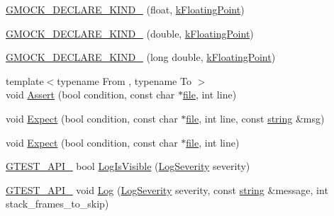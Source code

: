 \begin{DoxyCompactItemize}
\item 
\hyperlink{namespacetesting_1_1internal_ad4ebf1b53b79ac38fbd18ccf4d63ceca}{G\+M\+O\+C\+K\+\_\+\+D\+E\+C\+L\+A\+R\+E\+\_\+\+K\+I\+N\+D\+\_\+} (float, \hyperlink{namespacetesting_1_1internal_aa8747bda20137c9aa7f846dee830e686acdce59b8c136926ace18aa9c2995878d}{k\+Floating\+Point})
\item 
\hyperlink{namespacetesting_1_1internal_a45748f4c08b868cb4939081769cdc7b1}{G\+M\+O\+C\+K\+\_\+\+D\+E\+C\+L\+A\+R\+E\+\_\+\+K\+I\+N\+D\+\_\+} (double, \hyperlink{namespacetesting_1_1internal_aa8747bda20137c9aa7f846dee830e686acdce59b8c136926ace18aa9c2995878d}{k\+Floating\+Point})
\item 
\hyperlink{namespacetesting_1_1internal_af46fdd94d8aea0da729b554de443315f}{G\+M\+O\+C\+K\+\_\+\+D\+E\+C\+L\+A\+R\+E\+\_\+\+K\+I\+N\+D\+\_\+} (long double, \hyperlink{namespacetesting_1_1internal_aa8747bda20137c9aa7f846dee830e686acdce59b8c136926ace18aa9c2995878d}{k\+Floating\+Point})
\item 
{\footnotesize template$<$typename From , typename To $>$ }\\void \hyperlink{namespacetesting_1_1internal_a7a259643b7f2d23ce2b757728df42c99}{Assert} (bool condition, const char $\ast$\hyperlink{_07copy_08_2_read_camera_model_8m_a151631b2fd2bb776ef06c9f440a7ed74}{file}, int line)
\item 
void \hyperlink{namespacetesting_1_1internal_ab3000fc56be000e4fa6ed7cdcfee3106}{Expect} (bool condition, const char $\ast$\hyperlink{_07copy_08_2_read_camera_model_8m_a151631b2fd2bb776ef06c9f440a7ed74}{file}, int line, const \hyperlink{namespacetesting_1_1internal_a8e8ff5b11e64078831112677156cb111}{string} \&msg)
\item 
void \hyperlink{namespacetesting_1_1internal_a0dfe8a755bd02aa5ea162764b61a9d97}{Expect} (bool condition, const char $\ast$\hyperlink{_07copy_08_2_read_camera_model_8m_a151631b2fd2bb776ef06c9f440a7ed74}{file}, int line)
\item 
\hyperlink{gtest-port_8h_aa73be6f0ba4a7456180a94904ce17790}{G\+T\+E\+S\+T\+\_\+\+A\+P\+I\+\_\+} bool \hyperlink{namespacetesting_1_1internal_a69ffdba5ee36743e88d8f89b79e566ff}{Log\+Is\+Visible} (\hyperlink{namespacetesting_1_1internal_a203d1a8a2147a53d12bbdae40d443914}{Log\+Severity} severity)
\item 
\hyperlink{gtest-port_8h_aa73be6f0ba4a7456180a94904ce17790}{G\+T\+E\+S\+T\+\_\+\+A\+P\+I\+\_\+} void \hyperlink{namespacetesting_1_1internal_ac0bc151763a8187d74387c4b2ba685c9}{Log} (\hyperlink{namespacetesting_1_1internal_a203d1a8a2147a53d12bbdae40d443914}{Log\+Severity} severity, const \hyperlink{namespacetesting_1_1internal_a8e8ff5b11e64078831112677156cb111}{string} \&message, int stack\+\_\+frames\+\_\+to\+\_\+skip)

\end{DoxyCompactItemize}

